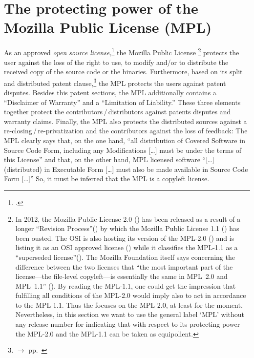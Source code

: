 \section{\texorpdfstring{The protecting power of the}{The} Mozilla Public License (MPL)}
 
As an approved \emph{open source license,}\footcite[cf.][\nopage wp]{OSI2012b}
the Mozilla Public License%
  \footnote{In 2012, the Mozilla Public License 2.0 
  (\cite[cf.][\nopage wp]{Mpl20MozFoundation2012a}) has been released as a
  result of a longer \enquote{Revision Process}(\cite[cf.][\nopage
  wp]{Mpl11To20MozFoundation2013a}) by which the  Mozilla Public License 1.1 
  (\cite[cf.][\nopage wp]{Mpl11MozFoundation2013a}) has been ousted. The OSI is 
  also hosting its version of the MPL-2.0 (\cite[cf.][\nopage
  wp]{Mpl20OsiLicense2013a}) and is listing it as an OSI approved license 
  (\cite[cf.][\nopage wp]{OSI2012b}) while it classifies the MPL-1.1 as a
  \enquote{superseded license}(\cite[cf.][\nopage wp]{OSI2013b}). The Mozilla
  Foundation itself says concerning the difference between the two licenses that 
  \enquote{the most important part of the license---the file-level copyleft---is
  essentially the same in MPL~2.0 and MPL~1.1} (\cite[cf.][\nopage
  wp]{Mpl11To20MozFoundation2013a}). By reading the MPL-1.1, one could get the
  impression that fulfilling all conditions of the MPL-2.0 would imply also to act
  in accordance to the MPL-1.1. Thus the \oslic{} focuses on the MPL-2.0, at least
  for the moment. Nevertheless, in this section we want to use the general label
  `MPL' without any release number for indicating that with respect to its
  protecting power the MPL-2.0 and the MPL-1.1 can be taken as equipollent.}
protects the user against the loss of the right to use, to modify and/or to
distribute the received copy of the source code or the
binaries.  Furthermore, based on its split and distributed patent
clause,\footnote{$\rightarrow$ \oslic{} pp.\ } the
MPL protects the users against patent disputes.
Besides this patent sections, the MPL additionally contains a
\enquote{Disclaimer of Warranty} and a \enquote{Limitation of
Liability.} These three elements together protect the
contributors\,/\,distributors against patents disputes and warranty claims.
Finally, the MPL also protects the distributed sources against a
re-closing\,/\,re-privatization and the contributors against the loss of
feedback: The MPL clearly says that, on the one hand, \enquote{all distribution
of Covered Software in Source Code Form, including any Modifications [\ldots]
must be under the terms of this License} and that, on the other
hand, MPL licensed software \enquote{[\ldots] (distributed) in Executable
Form [\ldots] must also be made available in Source Code Form
[\ldots]} So, it must be inferred that the MPL is a copyleft
license. 


